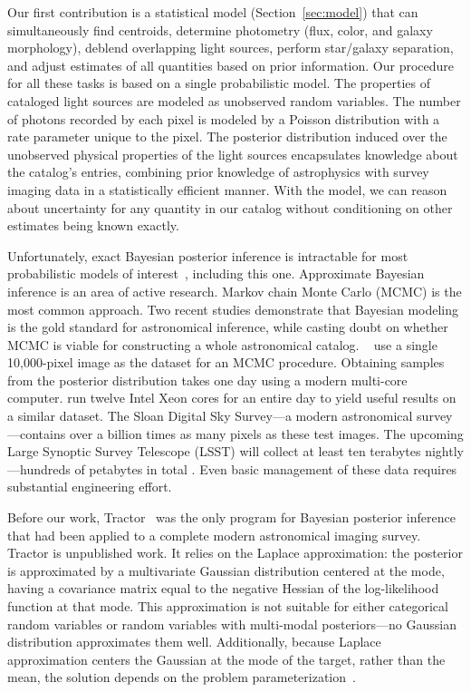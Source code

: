 Our first contribution is a statistical model (Section~\ref{sec:model}) that can simultaneously find centroids,
determine photometry (flux, color, and galaxy morphology), deblend overlapping light sources, perform star/galaxy separation, and adjust estimates of all quantities based on prior information.
Our procedure for all these tasks is based on a single probabilistic model.
The properties of cataloged light sources are modeled as unobserved random variables.
The number of photons recorded by each pixel is modeled by a Poisson distribution with a rate parameter unique to the pixel.
The posterior distribution induced over the unobserved physical properties of the light sources encapsulates knowledge about the catalog's entries, combining prior knowledge of astrophysics with survey imaging data in a statistically efficient manner.
With the model, we can reason about uncertainty
for any quantity in our catalog without conditioning on other estimates being known exactly.

Unfortunately, exact Bayesian posterior inference is intractable for most probabilistic models of interest~\citep{bishop2006pattern}, including this one.
Approximate Bayesian inference is an area of active research. Markov chain Monte Carlo (MCMC) is the most common approach.
Two recent studies demonstrate that Bayesian modeling is the gold standard for astronomical inference, while casting doubt on whether MCMC is viable for constructing a whole astronomical catalog.
~\citet{brewer2013probabilistic} use a single 10,000-pixel image as the dataset for an MCMC procedure.
Obtaining samples from the posterior distribution takes one day using a modern multi-core computer.
\citet{portillo2017improved} run
twelve Intel Xeon cores for an entire day to yield useful results on a similar dataset.
The Sloan Digital Sky Survey---a modern astronomical survey---contains over a billion times as many pixels as these test images.
The upcoming Large Synoptic Survey Telescope (LSST) will collect at least ten terabytes nightly---hundreds of petabytes in total \citep{lsst}. Even basic management of these data requires substantial engineering effort.

Before our work, Tractor~\citep{tractor} was the only program for Bayesian posterior inference that had been applied to a complete modern astronomical imaging survey. Tractor is unpublished work.
It relies on the Laplace approximation: the posterior is approximated by a multivariate Gaussian distribution centered at the mode, having a covariance matrix equal to the negative Hessian of the log-likelihood function at that mode. This approximation is not suitable for either categorical random variables or random variables with multi-modal posteriors---no Gaussian distribution approximates them well. Additionally, because Laplace approximation centers the Gaussian at the mode of the target, rather than the mean, the solution depends on the problem parameterization~\citep{bishop2006pattern}.

